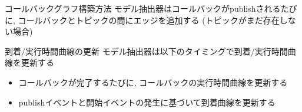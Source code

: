 \begin{frame}{コールバックグラフ構築方法}
    モデル抽出器はコールバックがpublishされるたびに, コールバックとトピックの間にエッジを追加する (トピックがまだ存在しない場合)
\end{frame}

\begin{frame}{到着/実行時間曲線の更新}
    モデル抽出器は以下のタイミングで到着/実行時間曲線を更新する
    \begin{itemize}
        \item コールバックが完了するたびに, コールバックの実行時間曲線を更新する
        \item publishイベントと開始イベントの発生に基づいて到着曲線を更新する
    \end{itemize}
\end{frame}


